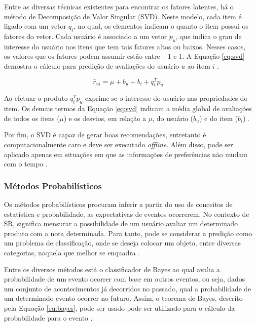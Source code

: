                 
        Entre as diversas técnicas existentes para encontrar os fatores latentes, há o método de Decomposição de Valor Singular (SVD). Neste modelo, cada item é ligado com um vetor $q_i$, no qual, os elementos indicam o quanto o item possui os fatores do vetor. Cada usuário é associado a um vetor $p_u$, que indica o grau de interesse do usuário nos itens que tem tais fatores altos ou baixos. Nesses casos, os valores que os fatores podem assumir estão entre $-1$ e $1$. A Equação \ref{eq:svd} demostra o cálculo para predição de avaliações do usuário $u$ ao item $i$ \cite{Ricci2010}.
        
        \begin{equation}
            \hat{r}_{ui} = \mu +b_u +b_i + q^T_ip_u  \label{eq:svd}
        \end{equation}
        
        Ao efetuar o produto $q^T_ip_u$ exprime-se o interesse do usuário nas propriedades do item. Os demais termos da Equação \ref{eq:svd} indicam a média global de avaliações de todos os itens ($\mu$) e os desvios, em relação a $\mu$, do usuário ($b_u$) e do item ($b_i$) \cite{Ricci2010}.
        
        Por fim, o SVD é capaz de gerar boas recomendações, entretanto é computacionalmente caro e deve ser executado \textit{offline}. Além disso, pode ser aplicado apenas em situações em que as informações de preferências não mudam com o tempo \cite{Bobadilla_2013}.
        
        \subsubsection{Métodos Probabilísticos}
        
        Os métodos probabilísticos procuram inferir a partir do uso de conceitos de estatística e probabilidade, as expectativas de eventos ocorrerem.  No contexto de SR, significa mensurar a possibilidade de um usuário avaliar um determinado produto com a nota determinada. Para tanto, pode se considerar a predição como um problema de classificação, onde se deseja colocar um objeto, entre diversas categorias, naquela que melhor se enquadra \cite{Jannach2010}.
                
        Entre os diversos métodos está o classificador de Bayes ao qual avalia a probabilidade de um evento ocorrer com base em outros eventos, ou seja, dados um conjunto de acontecimentos já decorridos no passado, qual a probabilidade de um determinado evento ocorrer no futuro. 
        Assim, o teorema de Bayes, descrito pela Equação \ref{eq:bayes}, pode ser usado pode ser utilizado para o cálculo da probabilidade para o evento \cite{Aggarwal2016}.
        
